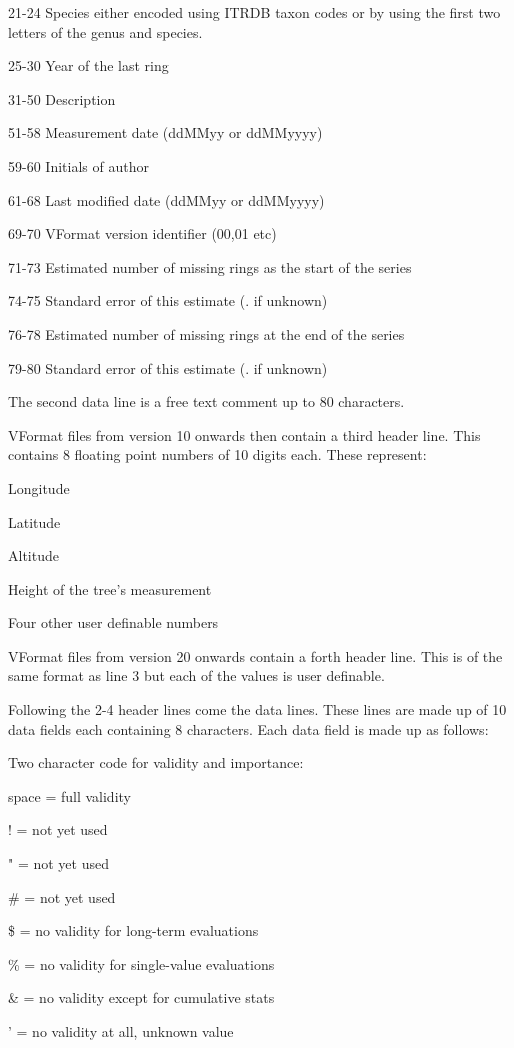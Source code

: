 \begin{itemize*}
\item  21-24 Species either encoded using ITRDB taxon codes or by using the first two letters of the genus and species.
\item  25-30 Year of the last ring
\item  31-50 Description
\item  51-58 Measurement date (ddMMyy or ddMMyyyy)
\item  59-60 Initials of author
\item  61-68 Last modified date (ddMMyy or ddMMyyyy)
\item  69-70 VFormat version identifier (00,01 etc)
\item  71-73 Estimated number of missing rings as the start of the series
\item  74-75 Standard error of this estimate (. if unknown)
\item  76-78 Estimated number of missing rings at the end of the series
\item  79-80 Standard error of this estimate (. if unknown) 
\end{itemize*}

The second data line is a free text comment up to 80 characters.

VFormat files from version 10 onwards then contain a third header line. This contains 8 floating point numbers of 10 digits each. These represent: 
\begin{itemize*}
 \item Longitude
 \item  Latitude
 \item  Altitude
 \item  Height of the tree's measurement
 \item  Four other user definable numbers 
\end{itemize*}

VFormat files from version 20 onwards contain a forth header line. This is of the same format as line 3 but each of the values is user definable.

Following the 2-4 header lines come the data lines. These lines are made up of 10 data fields each containing 8 characters. Each data field is made up as follows: 

\begin{itemize*}
 \item Two character code for validity and importance:
  \begin{itemize*}
  \item space = full validity
  \item ! = not yet used
  \item " = not yet used
  \item \# = not yet used
  \item \$ = no validity for long-term evaluations
  \item \% = no validity for single-value evaluations
  \item \& = no validity except for cumulative stats
  \item ' = no validity at all, unknown value 
  \end{itemize*}
\end{itemize*}

